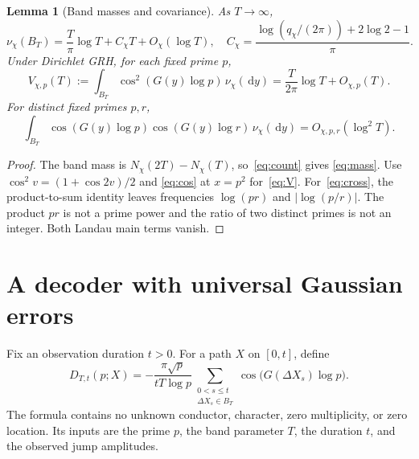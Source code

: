 \documentclass[11pt]{article}
\newtheorem{lemma}[theorem]{Lemma}
\theoremstyle{definition}
\newcommand{\dd}{\,\mathrm d}
\newcommand{\abs}[1]{\left|#1\right|}
\begin{document}
\begin{lemma}[Band masses and covariance]\label{lem:bandmoments}
As $T\to\infty$,
\begin{equation}\label{eq:mass}
 \nu_\chi(B_T)=\frac T\pi\log T+C_\chi T+O_\chi(\log T),
 \quad
 C_\chi=\frac{\log(q_\chi/(2\pi))+2\log2-1}{\pi}.
\end{equation}
Under Dirichlet GRH, for each fixed prime $p$,
\begin{equation}\label{eq:V}
 V_{\chi,p}(T):=\int_{B_T}\cos^2(G(y)\log p)\,\nu_\chi(\dd y)
 =\frac{T}{2\pi}\log T+O_{\chi,p}(T).
\end{equation}
For distinct fixed primes $p,r$,
\begin{equation}\label{eq:cross}
 \int_{B_T}\cos(G(y)\log p)\cos(G(y)\log r)\,\nu_\chi(\dd y)
 =O_{\chi,p,r}(\log^2 T).
\end{equation}
\end{lemma}

\begin{proof}
The band mass is $N_\chi(2T)-N_\chi(T)$, so~\eqref{eq:count} gives
\eqref{eq:mass}. Use $\cos^2v=(1+\cos2v)/2$ and
\eqref{eq:cos} at $x=p^2$ for~\eqref{eq:V}. For~\eqref{eq:cross}, the
product-to-sum identity leaves frequencies $\log(pr)$ and
$\abs{\log(p/r)}$. The product $pr$ is not a prime power and the ratio of two
distinct primes is not an integer. Both Landau main terms vanish.
\end{proof}

\section{A decoder with universal Gaussian errors}
\label{sec:decoder}

Fix an observation duration $t>0$. For a path $X$ on $[0,t]$, define
\begin{equation}\label{eq:decoder}
 D_{T,t}(p;X)=
 -\frac{\pi\sqrt p}{tT\log p}
 \sum_{\substack{0<s\le t\\\Delta X_s\in B_T}}
             \cos\bigl(G(\Delta X_s)\log p\bigr).
\end{equation}
The formula contains no unknown conductor, character, zero multiplicity, or
zero location. Its inputs are the prime $p$, the band parameter $T$, the duration
$t$, and the observed jump amplitudes.
\end{document}

